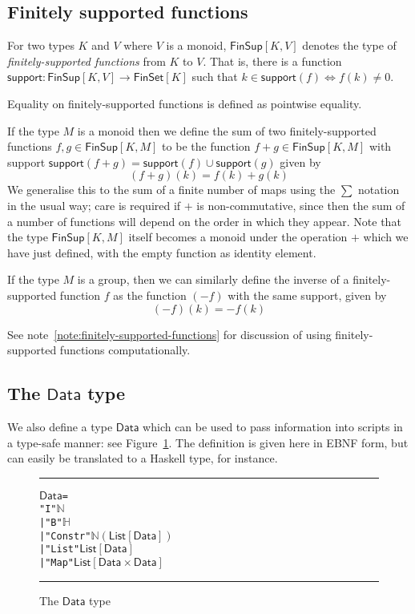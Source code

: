 \documentclass[a4paper]{article}
\newcounter{note}
\newcommand{\s}{\textsf}  %
\newcommand{\msf}[1]{\ensuremath{\mathsf{#1}}}
\newcommand\rfskip{7pt}
\newenvironment{ruledfigure}[1]{\begin{figure}[#1]\hrule\vspace{\rfskip}}{\vspace{\rfskip}\hrule\end{figure}}
\newcommand{\List}[1]{\ensuremath{\s{List}[#1]}}
\newcommand{\FinSet}[1]{\ensuremath{\s{FinSet}[#1]}}
\newcommand{\FinSup}[2]{\ensuremath{\s{FinSup}[#1,#2]}}
\newcommand{\support}{\msf{support}}
\newcommand{\Data}{\ensuremath{\s{Data}}}
\newcommand\N{\ensuremath{\mathbb{N}}}
\renewcommand\H{\ensuremath{\mathbb{H}}}
\begin{document}
\subsection {Finitely supported functions}
\label{sec:fsfs}

For two types $K$ and $V$ where $V$ is a monoid, $\FinSup{K}{V}$ denotes the type of
\textit{finitely-supported functions} from $K$ to $V$. That is, there is a
function $\support : \FinSup{K}{V} \rightarrow \FinSet{K}$ such that
$k \in \support(f) \Leftrightarrow f(k) \neq 0$.

Equality on finitely-supported functions is defined as pointwise equality.

If the type $M$ is a monoid then we define the sum of two finitely-supported
functions
$f, g \in \FinSup{K}{M}$ to be the function $f+g \in \FinSup{K}{M}$ with
support $\support (f+g) = \support(f) \cup \support(g)$ given by
\[(f+g)(k) = f(k) + g(k) \]
We generalise this to the sum of a finite number of maps using
the $\sum$ notation in the usual way; care is required if
$+$ is non-commutative, since then the sum of a number of
functions will depend on the order in which they appear. Note that
the type $\FinSup{K}{M}$ itself becomes a monoid under the
operation $+$ which we have just defined, with the empty function as
identity element.

If the type $M$ is a group, then we can
similarly define the inverse of a finitely-supported function $f$ as
the function $(-f)$ with the same support, given by
\[ (-f)(k) = -f(k) \]

See note~\ref{note:finitely-supported-functions} for discussion of using
finitely-supported functions computationally.

\subsection{The \Data{} type}
We also define a type \Data{} which can be used to pass information
into scripts in a type-safe manner: see Figure~\ref{fig:data-defn}. The
definition is given here in EBNF form, but can easily be translated to
a Haskell type, for instance.

\begin{ruledfigure}{H}
\begin{alltt}
  \Data =
      "I" \(\N\)
    | "B" \(\H\)
    | "Constr" \(\N (\List{\Data})\)
    | "List" \(\List{\Data}\)
    | "Map" \(\List{\Data\times\Data}\)
\end{alltt}
\caption{The \Data{} type}
\label{fig:data-defn}
\end{ruledfigure}
\end{document}
